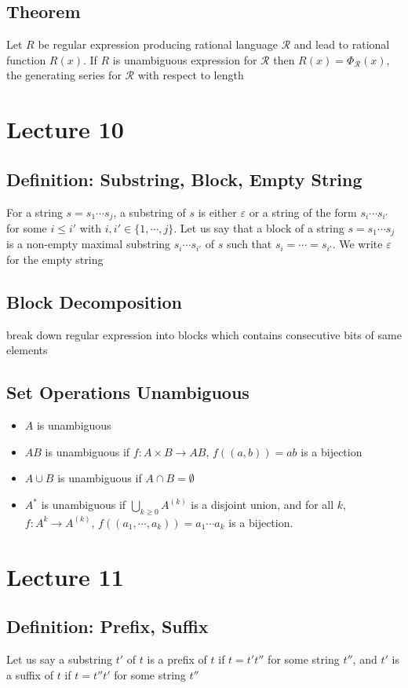 \documentclass[11pt]{article}
\newcommand{\ds}{\displaystyle}
\begin{document}
\subsection{Theorem}
Let $R$ be regular expression producing rational language $\mathcal{R}$ and lead to rational function $R(x)$. If $R$ is unambiguous expression for $\mathcal{R}$ then $R(x) = \Phi_\mathcal{R}(x)$, the generating series for $\mathcal{R}$ with respect to length

\section{Lecture 10}
\subsection{Definition: Substring, Block, Empty String}
For a string $s=s_1\cdots s_j$, a substring of $s$ is either $\varepsilon$ or a string of the form $s_i\cdots s_{i'}$ for some $i\leq i'$ with $i,i'\in\{1,\cdots,j\}$. Let us say that a 
block of a string $s=s_1\cdots s_j$ is a non-empty maximal substring $s_i\cdots s_{i'}$ of $s$ such that $s_i=\cdots=s_{i'}$. We write $\varepsilon$ for the empty string
\subsection{Block Decomposition}
break down regular expression into blocks which contains consecutive bits of same elements 
\subsection{Set Operations Unambiguous}
\begin{itemize}
  \item $A$ is unambiguous 
  \item $AB$ is unambiguous if $f:A\times B\rightarrow AB$, $f((a,b)) = ab$ is a bijection 
  \item $A\cup B$ is unambiguous if $A\cap B=\emptyset$
  \item $A^*$ is unambiguous if $\ds\bigcup_{k\geq0}A^{(k)}$ is a disjoint union, and for all $k$, $f:A^k\rightarrow A^{(k)}$, $f((a_1,\cdots,a_k)) = a_1\cdots a_k$ is a bijection.
\end{itemize}

\section{Lecture 11}
\subsection{Definition: Prefix, Suffix}
Let us say a substring $t'$ of $t$ is a prefix of $t$ if $t=t't''$ for some string $t''$, and $t'$ is a suffix of $t$ if $t=t''t'$ for some string $t''$
\end{document}
